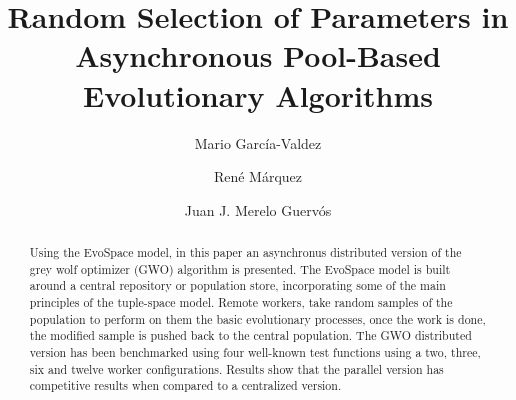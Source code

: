 \documentclass{llncs}
\begin{document}
\sloppy

\title{Random Selection of Parameters in Asynchronous Pool-Based Evolutionary Algorithms}

\author{Mario Garc\'ia-Valdez \and Ren\'e M\'arquez \and Juan J. Merelo Guerv\'os}


\maketitle

\begin{abstract}
 

    Using the EvoSpace model, in this paper an asynchronus distributed version of 
    the grey wolf optimizer (GWO) algorithm is presented. The EvoSpace model is
    built around a central repository or population store, incorporating some of 
    the main principles of the tuple-space model. Remote workers,
	take random samples of the population to perform on them the basic evolutionary
	processes, once the work is done, the modified sample is pushed back to the 
	central population. The GWO distributed version has been benchmarked using 
	four well-known test functions using a two, three, six and twelve worker configurations. 
	Results show that the parallel version has competitive results when compared 
	to a centralized version.  

	


	



\end{abstract}
\end{document}
